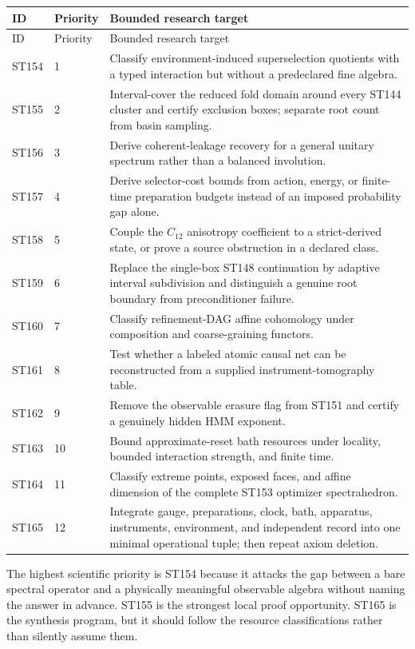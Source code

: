 \documentclass[11pt,a4paper]{article}
\begin{document}
\begin{longtable}{@{}p{}p{}p{}@{}}
\toprule ID & Priority & Bounded research target\\\midrule\endfirsthead
\toprule ID & Priority & Bounded research target\\\midrule\endhead
ST154 & 1 & Classify environment-induced superselection quotients with a typed interaction but without a predeclared fine algebra.\\
ST155 & 2 & Interval-cover the reduced fold domain around every ST144 cluster and certify exclusion boxes; separate root count from basin sampling.\\
ST156 & 3 & Derive coherent-leakage recovery for a general unitary spectrum rather than a balanced involution.\\
ST157 & 4 & Derive selector-cost bounds from action, energy, or finite-time preparation budgets instead of an imposed probability gap alone.\\
ST158 & 5 & Couple the $C_{12}$ anisotropy coefficient to a strict-derived state, or prove a source obstruction in a declared class.\\
ST159 & 6 & Replace the single-box ST148 continuation by adaptive interval subdivision and distinguish a genuine root boundary from preconditioner failure.\\
ST160 & 7 & Classify refinement-DAG affine cohomology under composition and coarse-graining functors.\\
ST161 & 8 & Test whether a labeled atomic causal net can be reconstructed from a supplied instrument-tomography table.\\
ST162 & 9 & Remove the observable erasure flag from ST151 and certify a genuinely hidden HMM exponent.\\
ST163 & 10 & Bound approximate-reset bath resources under locality, bounded interaction strength, and finite time.\\
ST164 & 11 & Classify extreme points, exposed faces, and affine dimension of the complete ST153 optimizer spectrahedron.\\
ST165 & 12 & Integrate gauge, preparations, clock, bath, apparatus, instruments, environment, and independent record into one minimal operational tuple; then repeat axiom deletion.\\
\bottomrule
\end{longtable}

The highest scientific priority is ST154 because it attacks the gap between a bare spectral operator and a physically meaningful observable algebra without naming the answer in advance. ST155 is the strongest local proof opportunity. ST165 is the synthesis program, but it should follow the resource classifications rather than silently assume them.
\end{document}

